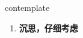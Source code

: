 
\begin{frame}
{\huge contemplate}
\begin{center}
\begin{enumerate}\Large
  \item \textbf{沉思，仔细考虑}
\end{enumerate}
\end{center}
\end{frame}
